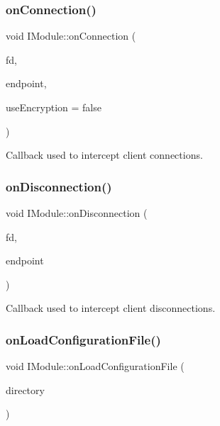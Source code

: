 \subsubsection{\texorpdfstring{onConnection()}{onConnection()}}
{\footnotesize\ttfamily void I\+Module\+::on\+Connection (\begin{DoxyParamCaption}\item[{const \mbox{\hyperlink{namespaceo_z_acbb8d05709257b6414b3979597f88c0c}{File\+Descriptor}}}]{fd,  }\item[{const \mbox{\hyperlink{classo_z_1_1_endpoint}{Endpoint}}}]{endpoint,  }\item[{bool}]{use\+Encryption = {\ttfamily false} }\end{DoxyParamCaption})\hspace{0.3cm}{\ttfamily [virtual]}}



Callback used to intercept client connections. 

\mbox{\label{classo_z_1_1_i_module_aa178220a4e7ba0cca50a131403e04847}} 
\subsubsection{\texorpdfstring{onDisconnection()}{onDisconnection()}}
{\footnotesize\ttfamily void I\+Module\+::on\+Disconnection (\begin{DoxyParamCaption}\item[{const \mbox{\hyperlink{namespaceo_z_acbb8d05709257b6414b3979597f88c0c}{File\+Descriptor}}}]{fd,  }\item[{const \mbox{\hyperlink{classo_z_1_1_endpoint}{Endpoint}}}]{endpoint }\end{DoxyParamCaption})\hspace{0.3cm}{\ttfamily [virtual]}}



Callback used to intercept client disconnections. 

\mbox{\label{classo_z_1_1_i_module_a61a2cc76594401ed2f50931a6a6b76f3}} 
\subsubsection{\texorpdfstring{onLoadConfigurationFile()}{onLoadConfigurationFile()}}
{\footnotesize\ttfamily void I\+Module\+::on\+Load\+Configuration\+File (\begin{DoxyParamCaption}\item[{const std\+::string \&}]{directory }\end{DoxyParamCaption})\hspace{0.3cm}{\ttfamily [virtual]}}



